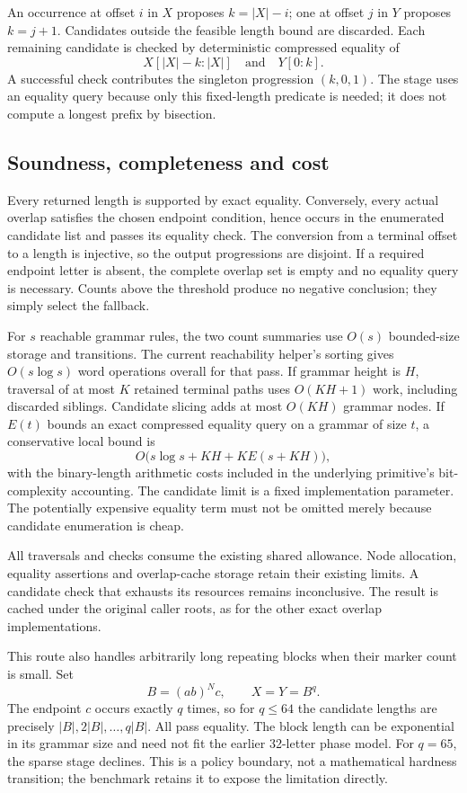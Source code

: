 An occurrence at offset $i$ in $X$ proposes $k=|X|-i$; one at offset $j$
in $Y$ proposes $k=j+1$. Candidates outside the feasible length bound
are discarded. Each remaining candidate is checked by deterministic
compressed equality of
\[
 X[|X|-k:|X|]\quad\text{and}\quad Y[0:k].
\]
A successful check contributes the singleton progression $(k,0,1)$.
The stage uses an equality query because only this fixed-length predicate
is needed; it does not compute a longest prefix by bisection.

\subsection{Soundness, completeness and cost}

Every returned length is supported by exact equality. Conversely, every
actual overlap satisfies the chosen endpoint condition, hence occurs in
the enumerated candidate list and passes its equality check. The conversion
from a terminal offset to a length is injective, so the output progressions
are disjoint. If a required endpoint letter is absent, the complete overlap
set is empty and no equality query is necessary. Counts above the threshold
produce no negative conclusion; they simply select the fallback.

For $s$ reachable grammar rules, the two count summaries use $O(s)$
bounded-size storage and transitions. The current reachability helper's
sorting gives $O(s\log s)$ word operations overall for that pass.
If grammar height is $H$, traversal of at most $K$ retained terminal paths
uses $O(KH+1)$ work, including discarded siblings. Candidate slicing adds
at most $O(KH)$ grammar nodes. If $E(t)$ bounds an exact compressed equality
query on a grammar of size $t$, a conservative local bound is
\[
 O\bigl(s\log s+KH+K E(s+KH)\bigr),
\]
with the binary-length arithmetic costs included in the underlying
primitive's bit-complexity accounting. The candidate limit is a fixed
implementation parameter. The potentially expensive equality term must not
be omitted merely because candidate enumeration is cheap.

All traversals and checks consume the existing shared allowance. Node
allocation, equality assertions and overlap-cache storage retain their
existing limits. A candidate check that exhausts its resources remains
inconclusive. The result is cached under the original caller roots, as for
the other exact overlap implementations.

This route also handles arbitrarily long repeating blocks when their
marker count is small. Set
\[
 B=(ab)^Nc,\qquad X=Y=B^q.
\]
The endpoint $c$ occurs exactly $q$ times, so for $q\le64$ the candidate
lengths are precisely $|B|,2|B|,\ldots,q|B|$. All pass equality. The block
length can be exponential in its grammar size and need not fit the earlier
32-letter phase model. For $q=65$, the sparse stage declines. This is a
policy boundary, not a mathematical hardness transition; the benchmark
retains it to expose the limitation directly.

